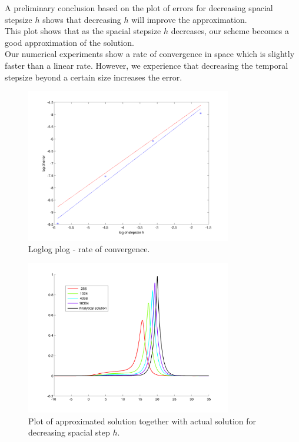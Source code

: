 A preliminary conclusion based on the plot of errors for decreasing spacial stepsize $h$ shows that decreasing $h$ will improve the approximation.\\


This plot shows that as the spacial stepsize $h$ decreases, our scheme becomes a good approximation of the solution. \\


Our numerical experiments show a rate of convergence in space which is slightly faster than a linear rate. However, we experience that decreasing the temporal stepsize beyond a certain size increases the error. 


\begin{figure}[h]
        \centering
        \includegraphics[width=0.8\textwidth]{gfx/loglog}
        \caption{Loglog plog - rate of convergence.}
        \label{fig:loglog}
\end{figure}

\begin{figure}[h]
        \centering
        \includegraphics[width=0.8\textwidth]{gfx/attimeT}
        \caption{Plot of approximated solution together with actual solution for decreasing spacial step $h$.}
        \label{fig:attimeT}
\end{figure}

